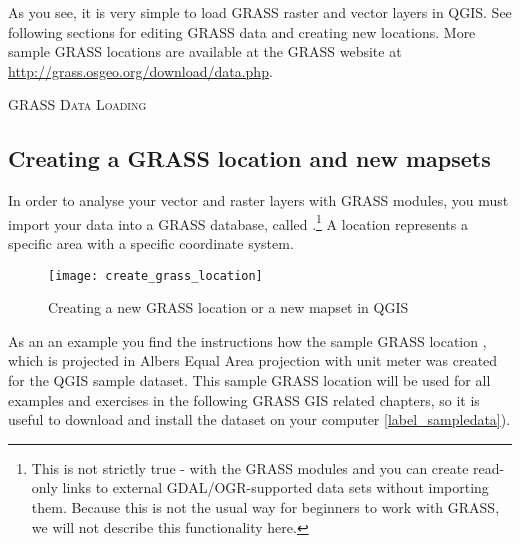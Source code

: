 As you see, it is very simple to load GRASS raster and vector layers in QGIS. 
See following sections for editing GRASS data and creating new locations.
More sample GRASS locations are available at the GRASS website at
\url{http://grass.osgeo.org/download/data.php}.

\begin{Tip}\caption{\textsc{GRASS Data Loading}}
\end{Tip} 

\subsection{Creating a GRASS location and new mapsets}\label{sec:create_loc}

In order to analyse your vector and raster layers with GRASS modules, you
must import your data into a GRASS database, called .\footnote{This is not strictly true - with the GRASS modules  and  you can create read-only links to external GDAL/OGR-supported data sets without importing them. Because this is not the usual way for beginners to work with GRASS, we will not describe this functionality here.} A
location represents a specific area with a specific coordinate
system.

\begin{figure}[ht]
\begin{center}
\caption{Creating a new GRASS location or a new mapset in QGIS \nixcaption}\label{fig:grass_location}\smallskip
\texttt{[image: create\_grass\_location]}
\end{center}  
\end{figure}

As an an example you find the instructions how the sample GRASS
location , which is projected in Albers Equal Area
projection with unit meter was created for the QGIS sample dataset. This
sample GRASS location  will be used for all examples and
exercises in the following GRASS GIS related chapters, so it is useful to
download and install the dataset on your computer \ref{label_sampledata}).

